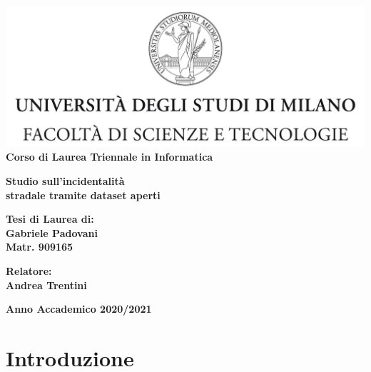 \documentclass[a4paper]{report}
\begin{document}
\begin{titlepage}
\begin{center}
\includegraphics[width=\textwidth]{Logo.jpg}\\
{\large{\bf Corso di Laurea Triennale in Informatica}}
\end{center}
\vspace{12mm}
\begin{center}
{\huge{\bf Studio sull'incidentalità}}\\
\vspace{4mm}
{\huge{\bf stradale tramite dataset aperti}}\\
\end{center}
\vspace{12mm}
\begin{flushright}
{\large{\bf Tesi di Laurea di:}}\\
{\large{\bf Gabriele Padovani}}\\
{\large{\bf Matr. 909165}}\\
\end{flushright}
\vspace{4mm}
\begin{flushleft}
{\large{\bf Relatore:}}\\
{\large{\bf Andrea Trentini}}\\
\end{flushleft}
\vspace{12mm}
\begin{center}
{\large{\bf Anno Accademico 2020/2021}}
\end{center}
\end{titlepage}

\tableofcontents

\listoftodos

\chapter{Introduzione}
\end{document}
